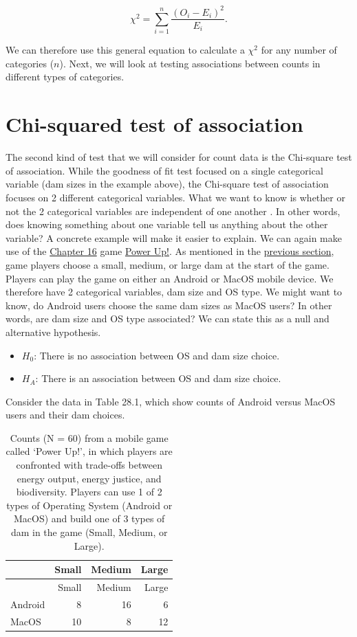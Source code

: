 \documentclass[
]{scrbook}
\providecommand{\tightlist}{%
  \setlength{\itemsep}{0pt}\setlength{\parskip}{0pt}}
\begin{document}
\[\chi^{2} = \sum_{i = 1}^{n} \frac{\left(O_{i} - E_{i}\right)^{2}}{E_{i}}.\]

We can therefore use this general equation to calculate a \(\chi^{2}\) for any number of categories (\(n\)).
Next, we will look at testing associations between counts in different types of categories.

\hypertarget{chi-squared-test-of-association}{%
\section{Chi-squared test of association}\label{chi-squared-test-of-association}}

The second kind of test that we will consider for count data is the Chi-square test of association.
While the goodness of fit test focused on a single categorical variable (dam sizes in the example above), the Chi-square test of association focuses on 2 different categorical variables.
What we want to know is whether or not the 2 categorical variables are independent of one another \citep{Box1978}.
In other words, does knowing something about one variable tell us anything about the other variable?
A concrete example will make it easier to explain.
We can again make use of the \protect\hyperlink{Chapter_16}{Chapter 16} game \href{https://play.google.com/store/apps/details?id=com.hyperluminal.stirlinguniversity.sustainabledevelopmentgame}{Power Up!}.
As mentioned in the \protect\hyperlink{chi-squared-goodness-of-fit}{previous section}, game players choose a small, medium, or large dam at the start of the game.
Players can play the game on either an Android or MacOS mobile device.
We therefore have 2 categorical variables, dam size and OS type.
We might want to know, do Android users choose the same dam sizes as MacOS users?
In other words, are dam size and OS type associated?
We can state this as a null and alternative hypothesis.

\begin{itemize}
\tightlist
\item
  \(H_{0}\): There is no association between OS and dam size choice.
\item
  \(H_{A}\): There is an association between OS and dam size choice.
\end{itemize}

Consider the data in Table 28.1, which show counts of Android versus MacOS users and their dam choices.

\begin{longtable}[]{@{}lrrr@{}}
\caption{\label{tab:unnamed-chunk-138}Counts (N = 60) from a mobile game called `Power Up!', in which players are confronted with trade-offs between energy output, energy justice, and biodiversity. Players can use 1 of 2 types of Operating System (Android or MacOS) and build one of 3 types of dam in the game (Small, Medium, or Large).}\tabularnewline
\toprule
& Small & Medium & Large \\
\midrule
\endfirsthead
\toprule
& Small & Medium & Large \\
\midrule
\endhead
Android & 8 & 16 & 6 \\
MacOS & 10 & 8 & 12 \\
\bottomrule
\end{longtable}
\end{document}

